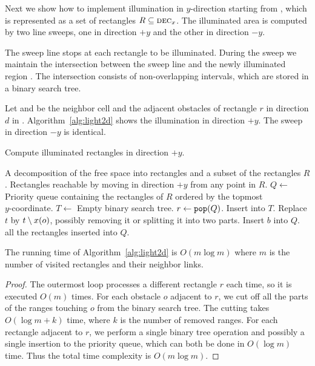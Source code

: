 \documentclass[english,gradu]{tktltiki2018}
\begin{document}
Next we show how to implement illumination in $y$-direction starting from , which is represented as a set of rectangles $R\subseteq\textsc{dec}_{x}$.
The illuminated area is computed by two line sweeps, one in direction $+y$ and the other in direction $-y$.

The sweep line stops at each rectangle to be illuminated.
During the sweep we maintain the intersection between the sweep line and the newly illuminated region .
The intersection consists of non-overlapping intervals, which are stored in a binary search tree.

Let  and  be the neighbor cell and the adjacent obstacles of rectangle $r$ in direction $d$ in .
Algorithm~\ref{alg:light2d} shows the illumination in direction $+y$.
The sweep in direction $-y$ is identical.

\begin{algorithm}
\caption{Compute illuminated rectangles in direction $+y$.}\label{alg:light2d}
\begin{algorithmic}
\Require A decomposition of the free space into rectangles and a subset of the rectangles $R$.
\Output Rectangles reachable by moving in direction $+y$ from any point in $R$.
\State $Q\gets$ Priority queue containing the rectangles of $R$ ordered by the topmost \\
	\hspace{10mm} $y$-coordinate.
\State $T\gets$ Empty binary search tree.
	\State $r\gets\texttt{pop}(Q)$.
		\State Insert  into $T$.
	\EndIf
			\State Replace $t$ by $t\setminus x(o)$, possibly removing it or splitting it into two parts.
		\EndFor
	\EndFor
			\State Insert $b$ into $Q$.
		\EndIf
	\EndFor
\EndWhile
\State \Return all the rectangles inserted into $Q$.
\end{algorithmic}
\end{algorithm}

\begin{lem}\label{lem:light2dtime}The running time of Algorithm~\ref{alg:light2d} is $O(m\log m)$ where $m$ is the number of visited rectangles and their neighbor links.\end{lem}
\begin{proof}
The outermost loop processes a different rectangle $r$ each time, so it is executed $O(m)$ times.
For each obstacle $o$ adjacent to $r$, we cut off all the parts of the ranges touching $o$ from the binary search tree.
The cutting takes $O(\log m + k)$ time, where $k$ is the number of removed ranges.
For each rectangle adjacent to $r$, we perform a single binary tree operation and possibly a single insertion to the priority queue, which can both be done in $O(\log m)$ time.
Thus the total time complexity is $O(m\log m)$.
\end{proof}
\end{document}
